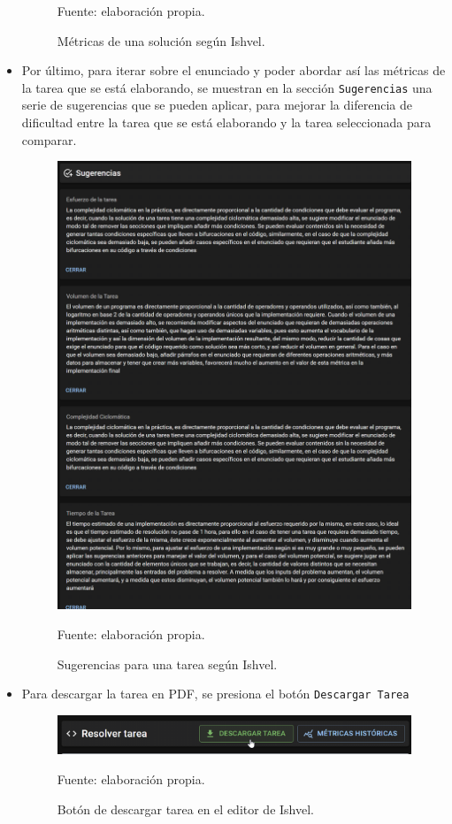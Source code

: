 \documentclass[letterpaper,12pt]{article}
\begin{document}
\begin{itemize}
\begin{figure}[H]
          \caption{Métricas de una solución según Ishvel.} Fuente: elaboración propia.
          \label{img:ishvel4}
        \end{figure}
  \item Por último, para iterar sobre el enunciado y poder abordar así las métricas de la tarea que se está elaborando, se muestran en la sección \texttt{Sugerencias} una serie de sugerencias que se pueden aplicar, para mejorar la diferencia de dificultad entre la tarea que se está elaborando y la tarea seleccionada para comparar.

        \begin{figure}[H]
          \centering
          \includegraphics[width=1.05\textwidth]{figures/ishvel5.png}
          \caption{Sugerencias para una tarea según Ishvel.} Fuente: elaboración propia.
          \label{img:ishvel5}
        \end{figure}
  \item Para descargar la tarea en PDF, se presiona el botón \texttt{Descargar Tarea}
        \begin{figure}[H]
          \centering
          \includegraphics[width=1\textwidth]{figures/ishvel6.png}
          \caption{Botón de descargar tarea en el editor de Ishvel.} Fuente: elaboración propia.
          \label{img:ishvel6}
        \end{figure}
\end{itemize}
\end{document}

